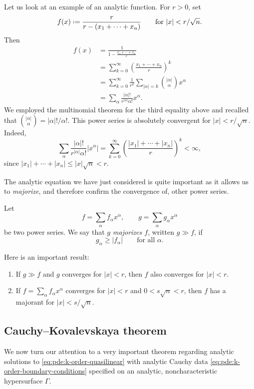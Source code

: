 \begin{example}
  Let us look at an example of an analytic function. For \(r>0\), set
  \[
    f(x)\defeq \frac{r}{r-(x_1+\dotsm+x_n)}
    \qquad
    \text{for \(|x|<r/\sqrt{n}\).}
  \]
  Then
  \begin{align*}
    f(x)
    &=\frac{1}{\displaystyle 1-\frac{x_1+\dotsb+x_n}{r}}\\
    &=\sum_{k=0}^\infty\left(\frac{x_1+\dotsb+x_n}{r}\right)^k\\
    &=\sum_{k=0}^\infty\frac{1}{r^k}\sum_{|\alpha|=k}\binom{|\alpha|}{\alpha}x^\alpha\\
    &=\sum_\alpha\frac{|\alpha|!}{r^{|\alpha|}\alpha!}x^\alpha.
  \end{align*}
  We employed the multinomial theorem for the third equality above and
  recalled that \(\binom{|\alpha|}{\alpha}=|\alpha|!/\alpha!\). This power
  series is absolutely convergent for \(|x|<r/\sqrt{n}\). Indeed,
  \[
    \sum_\alpha\frac{|\alpha|!}{r^{|\alpha|}{\alpha!}}|x^\alpha|
    =\sum_{k=0}^\infty\left(\frac{|x_1|+\dotsb+|x_n|}{r}\right)^k<\infty,
  \]
  since \(|x_1|+\dotsb+|x_n|\leq |x|\sqrt{n}<r\).
\end{example}

The analytic equation we have just considered is quite important as it
allows us to \emph{majorize}, and therefore confirm the convergence of,
other power series.

\begin{definition}
  Let
  \[
    f=\sum_\alpha f_\alpha x^\alpha,\qquad g=\sum_\alpha g_\alpha x^\alpha
  \]
  be two power series. We say that \emph{\(g\) majorizes \(f\)}, written
  \(g\gg f\), if
  \[
    g_\alpha\geq |f_\alpha|\qquad\text{for all \(\alpha\).}
  \]
\end{definition}

Here is an important result:
\begin{lemma}[Majorants]
  \hfill
  \begin{enumerate}[label=(\roman*),noitemsep]
  \item If \(g\gg f\) and \(g\) converges for \(|x|<r\), then \(f\) also
    converges for \(|x|<r\).
  \item If \(f=\sum_\alpha f_\alpha x^\alpha\) converges for \(|x|<r\) and
    \(0<s\sqrt{n}<r\), then \(f\) has a majorant for \(|x|<s/\sqrt{n}\).
  \end{enumerate}
\end{lemma}

\subsection{Cauchy--Kovalevskaya theorem}
We now turn our attention to a very important theorem regarding analytic
solutions to \eqref{eq:pde:k-order-quasilinear} with analytic Cauchy data
\eqref{eq:pde:k-order-boundary-conditions} specified on an analytic,
noncharacteristic hypersurface \(\Gamma\).

